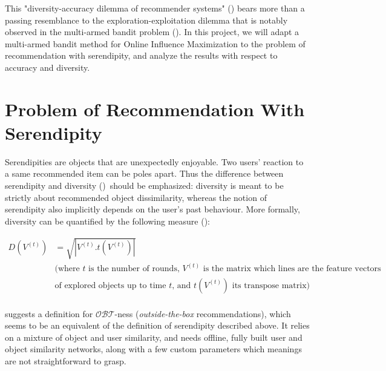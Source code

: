 \documentclass{article}
\begin{document}
This "diversity-accuracy dilemma of recommender systems" (\cite{zhou2010solving}) bears more than a passing resemblance to the exploration-exploitation dilemma that is notably observed in the multi-armed bandit problem (\cite{auer2002finite}). In this project, we will adapt a multi-armed bandit method for Online Influence Maximization to the problem of recommendation with serendipity, and analyze the results with respect to accuracy and diversity.

\section{Problem of Recommendation With Serendipity}

Serendipities are objects that are unexpectedly enjoyable. Two users' reaction to a same recommended item can be poles apart. Thus the difference between serendipity and diversity (\cite{abbassi2009getting}) should be emphasized: diversity is meant to be strictly about recommended object dissimilarity, whereas the notion of serendipity also implicitly depends on the user's past behaviour. More formally, diversity can be quantified by the following measure (\cite{vie2016modeles}):

\begin{equation}
\begin{split}
D(V^{(t)}) & = \sqrt{|V^{(t)}.t(V^{(t)})|}\\
& \mbox{(where $t$ is the number of rounds, $V^{(t)}$ is the matrix which lines are the feature vectors}\\
& \mbox{of explored objects up to time $t$, and $t(V^{(t)})$ its transpose matrix)}\\
\end{split}
\end{equation}

\citet{abbassi2009getting} suggests a definition for $\mathscr{O}\mathscr{B}\mathscr{T}$-ness (\textit{outside-the-box} recommendations), which seems to be an equivalent of the definition of serendipity described above. It relies on a mixture of object and user similarity, and needs offline, fully built user and object similarity networks, along with a few custom parameters which meanings are not straightforward to grasp.
\end{document}
